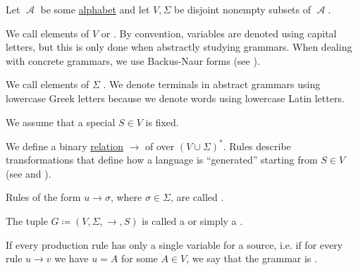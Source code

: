 \begin{definition}\label{def:grammar}
  Let \( \mscrA \) be some \hyperref[def:language/alphabet]{alphabet} and let \( V, \Sigma \) be disjoint nonempty subsets of \( \mscrA \).

  \begin{thmenum}
     We call elements of \( V \)  or . By convention, variables are denoted using capital letters, but this is only done when abstractly studying grammars. When dealing with concrete grammars, we use Backus-Naur forms (see ).

     We call elements of \( \Sigma \) . We denote terminals in abstract grammars using lowercase Greek letters because we denote words using lowercase Latin letters.

     We assume that a special  \( S \in V \) is fixed.

     We define a binary \hyperref[def:relation]{relation} \( \to \) of  over \( (V \cup \Sigma)^* \). Rules describe transformations that define how a language is \enquote{generated} starting from \( S \in V \) (see  and ).

     Rules of the form \( u \to \sigma \), where \( \sigma \in \Sigma \), are called .

     The tuple \( G \coloneqq (V, \Sigma, \to, S) \) is called a  or simply a .

     If every production rule has only a single variable for a source, i.e. if for every rule \( u \to v \) we have \( u = A \) for some \( A \in V \), we say that the grammar is .
  \end{thmenum}
\end{definition}

